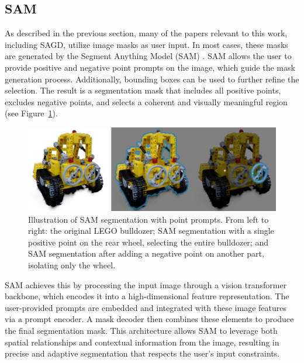 \documentclass[12pt]{article}
\begin{document}
\subsection{SAM}
As described in the previous section, many of the papers relevant to this work, including SAGD, utilize image masks as user input. In most cases, these masks are generated by the Segment Anything Model (SAM) \parencite{SAM}. SAM allows the user to provide positive and negative point prompts on the image, which guide the mask generation process. Additionally, bounding boxes can be used to further refine the selection. The result is a segmentation mask that includes all positive points, excludes negative points, and selects a coherent and visually meaningful region (see Figure~\ref{fig:samdemo}).
\begin{figure}[h!]
	\centering
	\includegraphics[width=\textwidth]{Images/samdemo.png}
	\caption{Illustration of SAM segmentation with point prompts. From left to right: the original LEGO bulldozer; SAM segmentation with a single positive point on the rear wheel, selecting the entire bulldozer; and SAM segmentation after adding a negative point on another part, isolating only the wheel.}
	\label{fig:samdemo}
\end{figure}
\FloatBarrier
\noindent
SAM achieves this by processing the input image through a vision transformer backbone, which encodes it into a high-dimensional feature representation. The user-provided prompts are embedded and integrated with these image features via a prompt encoder. A mask decoder then combines these elements to produce the final segmentation mask. This architecture allows SAM to leverage both spatial relationships and contextual information from the image, resulting in precise and adaptive segmentation that respects the user’s input constraints.
\end{document}
